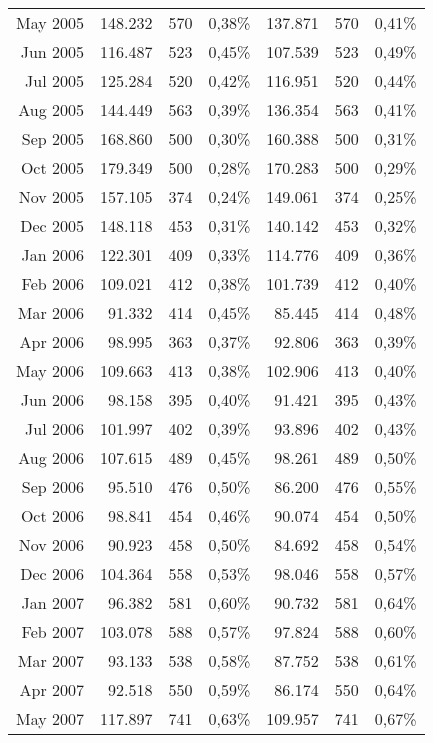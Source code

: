\begin{longtable}{r|rrr|rrr}
May 2005 & 148.232 & 570   & 0,38\% & 137.871 & 570   & 0,41\% \\
Jun 2005 & 116.487 & 523   & 0,45\% & 107.539 & 523   & 0,49\% \\
Jul 2005 & 125.284 & 520   & 0,42\% & 116.951 & 520   & 0,44\% \\
Aug 2005 & 144.449 & 563   & 0,39\% & 136.354 & 563   & 0,41\% \\
Sep 2005 & 168.860 & 500   & 0,30\% & 160.388 & 500   & 0,31\% \\
Oct 2005 & 179.349 & 500   & 0,28\% & 170.283 & 500   & 0,29\% \\
Nov 2005 & 157.105 & 374   & 0,24\% & 149.061 & 374   & 0,25\% \\
Dec 2005 & 148.118 & 453   & 0,31\% & 140.142 & 453   & 0,32\% \\
Jan 2006 & 122.301 & 409   & 0,33\% & 114.776 & 409   & 0,36\% \\
Feb 2006 & 109.021 & 412   & 0,38\% & 101.739 & 412   & 0,40\% \\
Mar 2006 & 91.332  & 414   & 0,45\% & 85.445  & 414   & 0,48\% \\
Apr 2006 & 98.995  & 363   & 0,37\% & 92.806  & 363   & 0,39\% \\
May 2006 & 109.663 & 413   & 0,38\% & 102.906 & 413   & 0,40\% \\
Jun 2006 & 98.158  & 395   & 0,40\% & 91.421  & 395   & 0,43\% \\
Jul 2006 & 101.997 & 402   & 0,39\% & 93.896  & 402   & 0,43\% \\
Aug 2006 & 107.615 & 489   & 0,45\% & 98.261  & 489   & 0,50\% \\
Sep 2006 & 95.510  & 476   & 0,50\% & 86.200  & 476   & 0,55\% \\
Oct 2006 & 98.841  & 454   & 0,46\% & 90.074  & 454   & 0,50\% \\
Nov 2006 & 90.923  & 458   & 0,50\% & 84.692  & 458   & 0,54\% \\
Dec 2006 & 104.364 & 558   & 0,53\% & 98.046  & 558   & 0,57\% \\
Jan 2007 & 96.382  & 581   & 0,60\% & 90.732  & 581   & 0,64\% \\
Feb 2007 & 103.078 & 588   & 0,57\% & 97.824  & 588   & 0,60\% \\
Mar 2007 & 93.133  & 538   & 0,58\% & 87.752  & 538   & 0,61\% \\
Apr 2007 & 92.518  & 550   & 0,59\% & 86.174  & 550   & 0,64\% \\
May 2007 & 117.897 & 741   & 0,63\% & 109.957 & 741   & 0,67\% \\

\end{longtable}
